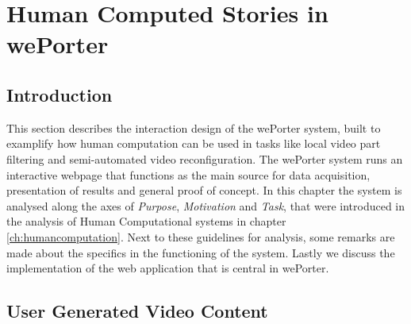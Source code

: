 \chapter{Human Computed Stories in wePorter}
\label{chap:weporter}

% 
% 
% 
% 

\section{Introduction}
This section describes the interaction design of the wePorter system, built to examplify how human computation can be used in tasks like local video part filtering and semi-automated video reconfiguration. The wePorter system runs an interactive webpage that functions as the main source for data acquisition, presentation of results and general proof of concept. In this chapter the system is analysed along the axes of \textit{Purpose}, \textit{Motivation} and \textit{Task}, that were introduced in the analysis of Human Computational systems in chapter \ref{ch:humancomputation}. Next to these guidelines for analysis, some remarks are made about the specifics in the functioning of the system. Lastly we discuss the implementation of the web application that is central in wePorter.

\section{User Generated Video Content}

